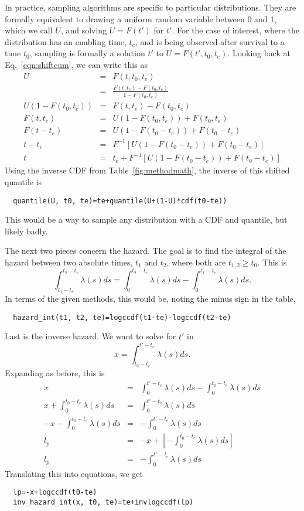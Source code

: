 \documentclass{article}
\begin{document}
In practice, sampling algorithms are specific to particular distributions.
They are formally equivalent to drawing a uniform random variable between
0 and 1, which we call $U$, and solving $U=F(t')$ for $t'$.
For the case of interest, where the distribution has an enabling time, $t_e$,
and is being observed after survival to a time $t_0$, sampling is formally
a solution $t'$ to $U=F(t', t_0, t_e)$. Looking back at Eq.~\ref{eqn:shiftcum},
we can write this as
\begin{eqnarray}
 U&=&F(t,t_0,t_e) \\
  &=&\frac{F(t,t_e)-F(t_0,t_e)}{1-F(t_0,t_e)} \\
U(1-F(t_0,t_e))&=&F(t,t_e)-F(t_0,t_e) \\
F(t,t_e)&=&U(1-F(t_0,t_e))+F(t_0,t_e) \\
F(t-t_e)&=&U(1-F(t_0-t_e))+F(t_0-t_e) \\
t-t_e &=& F^{-1}\left[U(1-F(t_0-t_e))+F(t_0-t_e)\right] \\
t &=& t_e+F^{-1}\left[U(1-F(t_0-t_e))+F(t_0-t_e)\right]
\end{eqnarray}
Using the inverse \textsc{CDF} from Table~\ref{fig:methodmath},
the inverse of this shifted quantile is
\begin{lstlisting}
  quantile(U, t0, te)=te+quantile(U+(1-U)*cdf(t0-te))
\end{lstlisting}
This would be a way to sample any distribution with a \textsc{CDF} and
quantile, but likely badly.

The next two pieces concern the hazard. The goal is to find the integral
of the hazard between two absolute times, $t_1$ and $t_2$, where both
are $t_{1,2}\ge t_0$. This is
\begin{equation}
  \int_{t_1-t_e}^{t_2-t_e} \lambda(s)ds=\int_{0}^{t_2-t_e} \lambda(s)ds
  	-\int_{0}^{t_1-t_e} \lambda(s)ds.
\end{equation}
In terms of the given methods, this would be, noting the minus sign
in the table,
\begin{lstlisting}
  hazard_int(t1, t2, te)=logccdf(t1-te)-logccdf(t2-te)
\end{lstlisting}

Last is the inverse hazard. We want to solve for $t'$ in
\begin{equation}
  x=\int_{t_0-t_e}^{t'-t_e}\lambda(s)ds.
\end{equation}
Expanding as before, this is
\begin{eqnarray}
  x&=&\int_{0}^{t'-t_e}\lambda(s)ds-\int_{0}^{t_0-t_e}\lambda(s)ds \\
  x+\int_{0}^{t_0-t_e}\lambda(s)ds&=&\int_{0}^{t'-t_e}\lambda(s)ds \\
  -x-\int_{0}^{t_0-t_e}\lambda(s)ds&=& -\int_{0}^{t'-t_e}\lambda(s)ds \\
  l_p&=&-x+\left[-\int_{0}^{t_0-t_e}\lambda(s)ds\right] \\
  l_p&=&-\int_{0}^{t'-t_e}\lambda(s)ds
\end{eqnarray}
Translating this into equations, we get
\begin{lstlisting}
  lp=-x+logccdf(t0-te)
  inv_hazard_int(x, t0, te)=te+invlogccdf(lp)
\end{lstlisting}
\end{document}
